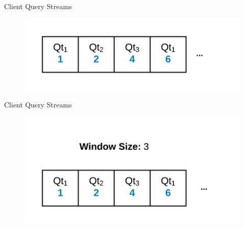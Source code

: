 \documentclass[12pt]{beamer}
\begin{document}
\begin{frame}[fragile]{Client Query Streams}
    \begin{figure}
        \includegraphics[scale=0.2]{apollo_client_query_stream}
    \end{figure}
\end{frame}

\begin{frame}[fragile]{Client Query Streams}
    \begin{figure}
        \includegraphics[scale=0.2]{apollo_client_query_stream_2}
    \end{figure}
\end{frame}

\end{document}
